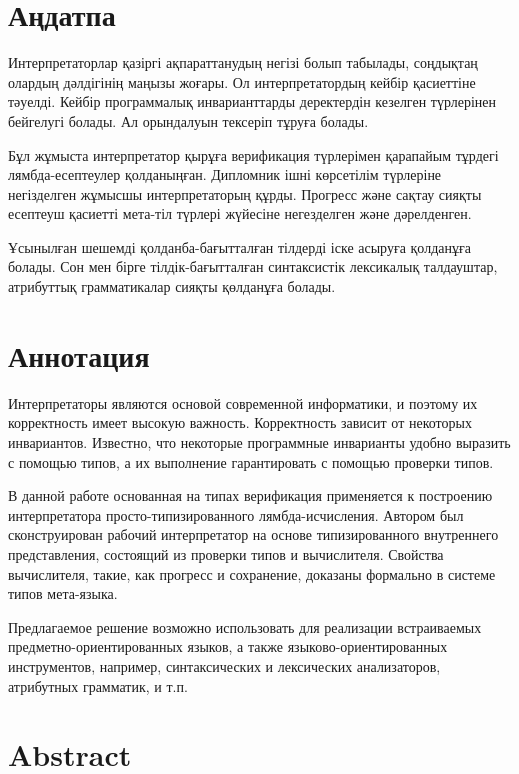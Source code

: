 \section*{Аңдатпа}

Интерпретаторлар қазіргі ақпараттанудың негізі болып табылады, соңдықтаң олардың дәлдігінің маңызы жоғары. Ол интерпретатордың кейбір қасиеттіне тәуелді. Кейбір программалық инварианттарды деректердін кезелген түрлерінен бейгелугі болады. Ал орындалуын тексеріп тұруға болады.

Бұл жұмыста интерпретатор қырұға верификация түрлерімен қарапайым тұрдегі лямбда-есептеулер қолданыңған. Дипломник ішні көрсетілім түрлеріне негізделген жұмысшы интерпретаторың құрды. Прогресс және сақтау сияқты есептеуш қасиетті мета-тіл түрлері жүйесіне негезделген және дәрелденген.

Ұсынылған шешемді қолданба-бағытталған тілдерді іске асыруға қолданұға болады. Сон мен бірге тілдік-бағытталған синтаксистік лексикалық талдауштар, атрибуттық грамматикалар сияқты қөлданұға болады.

\newpage
\section*{Аннотация}

Интерпретаторы являются основой современной информатики, и поэтому их корректность имеет высокую важность. Корректность зависит от некоторых инвариантов. Известно, что некоторые программные инварианты удобно выразить с помощью типов, а их выполнение гарантировать с помощью проверки типов.

В данной работе основанная на типах верификация применяется к построению интерпретатора просто-типизированного лямбда-исчисления. Автором был сконструирован рабочий интерпретатор на основе типизированного внутреннего представления, состоящий из проверки типов и вычислителя. Свойства вычислителя, такие, как прогресс и сохранение, доказаны формально в системе типов мета-языка.

Предлагаемое решение возможно использовать для реализации встраиваемых предметно-ориентированных языков, а также языково-ориентированных инструментов, например, синтаксических и лексических анализаторов, атрибутных грамматик, и т.п.

\newpage
\section*{Abstract}

